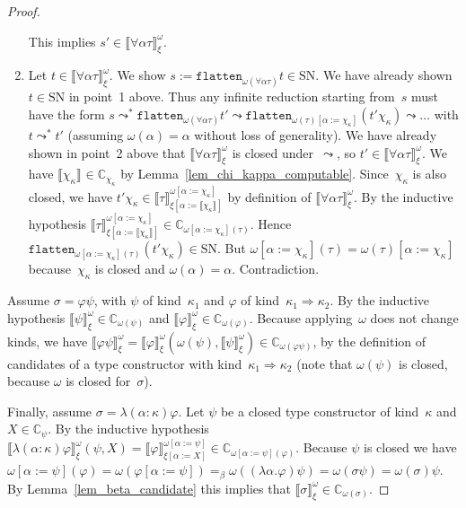 \documentclass[a4paper,UKenglish,cleveref,autoref,numberwithinsect]{lipics-v2019}
\theoremstyle{definition}
\newcommand{\arrkind}{\Rightarrow}
\newcommand{\subst}[2]{#1:=#2}
\newcommand{\arrW}{\leadsto}
\newcommand{\flatten}{\mathtt{flatten}}
\newcommand{\SN}{\mathrm{SN}}
\newcommand{\Cb}{\mathbb{C}}
\newcommand{\val}[3]{\ensuremath{\llbracket#1\rrbracket_{#2}^{#3}}}
\begin{document}
\begin{proof}
\begin{enumerate}
\[    \]
    This implies $s' \in \val{\forall\alpha\tau}{\xi}{\omega}$.
  \item Let $t \in \val{\forall\alpha\tau}{\xi}{\omega}$. We show $s
    := \flatten_{\omega(\forall\alpha\tau)}t \in \SN$. We have
    already shown $t \in \SN$ in point~1 above. Thus any infinite
    reduction starting from~$s$ must have the form $s \arrW^*
    \flatten_{\omega(\forall\alpha\tau)}t' \arrW
    \flatten_{\omega(\tau)[\subst{\alpha}{\chi_\kappa}]}(t'
    \chi_\kappa) \arrW \ldots$ with $t \arrW^* t'$ (assuming
    $\omega(\alpha) = \alpha$ without loss of generality). We have
    already shown in point~2 above that
    $\val{\forall\alpha\tau}{\xi}{\omega}$ is closed
    under~$\arrW$, so $t' \in
    \val{\forall\alpha\tau}{\xi}{\omega}$. We have
    $\val{\chi_\kappa}{}{} \in \Cb_{\chi_\kappa}$ by
    Lemma~\ref{lem_chi_kappa_computable}. Since~$\chi_\kappa$ is also
    closed, we have $t' \chi_\kappa \in
    \val{\tau}{\xi[\subst{\alpha}{\val{\chi_\kappa}{}{}}]}{\omega[\subst{\alpha}{\chi_\kappa}]}$
    by definition of $\val{\forall\alpha\tau}{\xi}{\omega}$. By the
    inductive hypothesis
    $\val{\tau}{\xi[\subst{\alpha}{\val{\chi_\kappa}{}{}}]}{\omega[\subst{\alpha}{\chi_\kappa}]}
    \in \Cb_{\omega[\subst{\alpha}{\chi_\kappa}](\tau)}$. Hence
    $\flatten_{\omega[\subst{\alpha}{\chi_\kappa}](\tau)}(t'\chi_\kappa)\in\SN$. But
    $\omega[\subst{\alpha}{\chi_\kappa}](\tau) =
    \omega(\tau)[\subst{\alpha}{\chi_\kappa}]$ because~$\chi_\kappa$
    is closed and $\omega(\alpha) = \alpha$. Contradiction.
  \end{enumerate}

  Assume $\sigma = \varphi\psi$, with $\psi$ of kind~$\kappa_1$ and
  $\varphi$ of kind~$\kappa_1\arrkind\kappa_2$. By the inductive
  hypothesis $\val{\psi}{\xi}{\omega} \in \Cb_{\omega(\psi)}$ and
  $\val{\varphi}{\xi}{\omega} \in \Cb_{\omega(\varphi)}$. Because
  applying~$\omega$ does not change kinds, we have
  $\val{\varphi\psi}{\xi}{\omega} =
  \val{\varphi}{\xi}{\omega}(\omega(\psi), \val{\psi}{\xi}{\omega})
  \in \Cb_{\omega(\varphi\psi)}$, by the definition of candidates of a
  type constructor with kind~$\kappa_1\arrkind\kappa_2$ (note that
  $\omega(\psi)$ is closed, because $\omega$ is closed for~$\sigma$).

  Finally, assume $\sigma = \lambda(\alpha:\kappa)\varphi$. Let $\psi$
  be a closed type constructor of kind~$\kappa$ and $X \in
  \Cb_{\psi}$. By the inductive hypothesis
  $\val{\lambda(\alpha:\kappa)\varphi}{\xi}{\omega}(\psi,X) =
  \val{\varphi}{\xi[\subst{\alpha}{X}]}{\omega[\subst{\alpha}{\psi}]}
  \in \Cb_{\omega[\subst{\alpha}{\psi}](\varphi)}$. Because $\psi$ is
  closed we have $\omega[\subst{\alpha}{\psi}](\varphi) =
  \omega(\varphi[\subst{\alpha}{\psi}]) =_\beta
  \omega((\lambda\alpha.\varphi)\psi) = \omega(\sigma\psi) =
  \omega(\sigma)\psi$. By Lemma~\ref{lem_beta_candidate} this implies
  that $\val{\sigma}{\xi}{\omega} \in \Cb_{\omega(\sigma)}$.
\end{proof}
\end{document}

